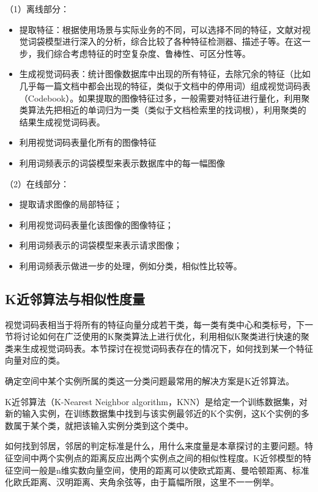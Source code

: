 （1）离线部分：
\begin{itemize}
\item 提取特征：根据使用场景与实际业务的不同，可以选择不同的特征，文献\cite{Zhang:2006ej}对视觉词袋模型进行深入的分析，综合比较了各种特征检测器、描述子等。在这一步，我们综合考虑特征的时空复杂度、鲁棒性、可区分性等。
\item 生成视觉词码表：统计图像数据库中出现的所有特征，去除冗余的特征（比如几乎每一篇文档中都会出现的特征，类似于文档中的停用词）组成视觉词码表（Codebook）。如果提取的图像特征过多，一般需要对特征进行量化，利用聚类算法先把相近的单词归为一类（类似于文档检索里的找词根），利用聚类的结果生成视觉词码表。
\item 利用视觉词码表量化所有的图像特征
\item 利用词频表示的词袋模型来表示数据库中的每一幅图像
\end{itemize}

（2）在线部分：
\begin{itemize}
\item 提取请求图像的局部特征；
\item 利用视觉词码表量化该图像的图像特征；
\item 利用词频表示的词袋模型来表示请求图像；
\item 利用词频表示做进一步的处理，例如分类，相似性比较等。
\end{itemize}


\subsection{K近邻算法与相似性度量}
视觉词码表相当于将所有的特征向量分成若干类，每一类有类中心和类标号，下一节将讨论如何在广泛使用的K聚类算法上进行优化，利用相似K聚类进行快速的聚类来生成视觉词码表。本节探讨在视觉词码表存在的情况下，如何找到某一个特征向量对应的类。

确定空间中某个实例所属的类这一分类问题最常用的解决方案是K近邻算法。

K近邻算法（K-Nearest Neighbor algorithm，KNN）是给定一个训练数据集，对新的输入实例，在训练数据集中找到与该实例最邻近的K个实例，这K个实例的多数属于某个类，就把该输入实例分类到这个类中。

如何找到邻居，邻居的判定标准是什么，用什么来度量是本章探讨的主要问题。特征空间中两个实例点的距离反应出两个实例点之间的相似性程度。K近邻模型的特征空间一般是n维实数向量空间，使用的距离可以使欧式距离、曼哈顿距离、标准化欧氏距离、汉明距离、夹角余弦等，由于篇幅所限，这里不一一例举。

